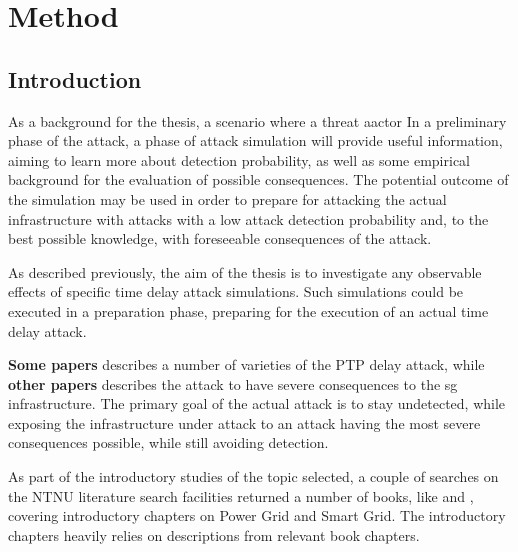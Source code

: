 \chapter{Method} 


\section{Introduction}


As a background for the thesis, a scenario where a threat aactor
 In a preliminary phase of the attack, a phase of attack simulation will provide useful information, aiming to learn more about detection probability, as well as some empirical background for the evaluation of possible consequences.
The potential outcome of the simulation may be used in order to prepare for attacking the actual infrastructure with attacks with a low attack detection probability and, to the best possible knowledge, with foreseeable consequences of the attack.

As described previously, the aim of the thesis is to investigate any observable effects of specific time delay attack simulations. Such simulations could be executed in a preparation phase, preparing for the execution of an actual time delay attack.

 \textbf{Some papers} describes a number of varieties of the PTP delay attack, while \textbf{other papers} describes the attack to have severe consequences to the \acrshort{sg} infrastructure. The primary goal of the actual attack is to stay undetected, while exposing the infrastructure under attack to an attack having the most severe consequences possible, while still avoiding detection.  
 


As part of the introductory studies of the topic selected, a couple of searches on the NTNU literature search facilities returned a number of books, like \cite{BlumeStevenW2007Epsb} and \cite{kabalci2019smart}, covering introductory chapters on Power Grid and Smart Grid. The introductory chapters heavily relies on descriptions from relevant book chapters. 








